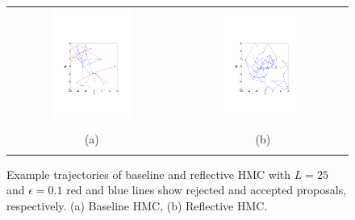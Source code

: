 \documentclass{article} %
\begin{document}
\begin{figure}
\setlength{\tabcolsep}{0em}
\vspace{-1mm}
\begin{center}
\begin{tabular}{cc}
\includegraphics[trim={3.2cm 6cm 3.2cm 9cm},clip,width=0.49\textwidth]{../plots3/BaselineHMC_l25_eps0_1_log_scatter2D.pdf} 
&\includegraphics[trim={3.2cm 6cm 3cm 9cm},clip,width=0.49\textwidth]{../plots3/ReflectiveHMC_l25_eps0_1_log_scatter2D.pdf}  \\
\vspace{-3.5mm}
\\
   \footnotesize(a) 
& \footnotesize(b) 
\\
\multicolumn{2}{c}{}
\end{tabular}
\end{center}
\vspace{-8mm}
\caption{\footnotesize
Example trajectories of baseline and reflective HMC with $L=25$ and $\epsilon=0.1$ red and blue lines show rejected and accepted proposals, respectively. (a) Baseline HMC, (b) Reflective HMC.}
\label{fig:sup.traj2}
\vspace{-10pt}
\end{figure}
\end{document}
